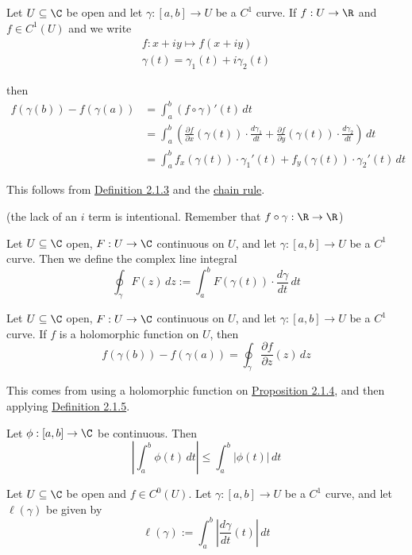 \label{f37b676}

Let $U\subseteq\C$ be open and let $\gamma:[a,b]\to U$ be a $C^1$
curve. If $f:U\to\R$ and $f\in C^1(U)$ and we write
\begin{gather*}
	f:x+iy\mapsto f(x+iy) \\
	\gamma(t)=\gamma_1(t)+i\gamma_2(t)
\end{gather*}

then
\begin{align*}
	f(\gamma(b))-f(\gamma(a))
	 & =\int_a^b (f\circ\gamma)'(t)\,dt \\
	 & =\int_a^b\left(
	\frac{\partial f}{\partial x}(\gamma(t))\cdot\frac{d\gamma_1}{dt}+
	\frac{\partial f}{\partial y}(\gamma(t))\cdot\frac{d\gamma_2}{dt}
	\right)\,dt                         \\
	 & =\int_a^b
	f_x(\gamma(t))\cdot\gamma_1'(t)+f_y(\gamma(t))\cdot\gamma_2'(t)
	\,dt
\end{align*}

This follows from \href{c511702}{Definition 2.1.3} and the
\href{d969d46}{chain rule}.

(the lack of an $i$ term is intentional. Remember that
$f\circ\gamma:\R\to\R$)

\label{b1e96fc}

Let $U\subseteq\C$ open, $F:U\to\C$ continuous on $U$, and let
$\gamma:[a,b]\to U$ be a $C^1$ curve. Then we define the complex line
integral
$$
	\oint_\gamma F(z)\,dz:=\int_a^bF(\gamma(t))\cdot\frac{d\gamma}{dt}\,dt
$$

\label{c526c09}

Let $U\subseteq\C$ open, $F:U\to\C$ continuous on $U$, and let
$\gamma:[a,b]\to U$ be a $C^1$ curve. If $f$ is a holomorphic function
on $U$, then
$$
	f(\gamma(b))-f(\gamma(a))=\oint_\gamma\frac{\partial f}{\partial z}(z)\,dz
$$

This comes from using a holomorphic function on
\href{f37b676}{Proposition 2.1.4}, and then applying
\href{b1e96fc}{Definition 2.1.5}.

\label{bcec8b1}

Let $\phi:[a,b]\to\C$ be continuous. Then
$$
	\left|\int_a^b\phi(t)\,dt\right|\leq\int_a^b|\phi(t)|\,dt
$$

\label{faf3f86}

Let $U\subseteq\C$ be open and $f\in C^0(U)$. Let $\gamma:[a,b]\to U$
be a $C^1$ curve, and let $\ell(\gamma)$ be given by
$$
	\ell(\gamma):=\int_a^b\left|\frac{d\gamma}{dt}(t)\right|\,dt
$$

